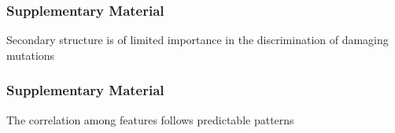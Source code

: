 \documentclass[10pt, british, luatex]{beamer}
\begin{document}
\begin{frame}
	\frametitle{Supplementary Material}
	Secondary structure is of limited importance in the discrimination of damaging mutations\\[1ex]
	{%
	\begin{center}%
		\let\bfseries\sbseries%
		
	\end{center}%
	}
\end{frame}

\begin{frame}
	\frametitle{Supplementary Material}
	The correlation among features follows predictable patterns\\[1ex]
	{%
	\centering%
	\let\bfseries\sbseries%
	
	}
\end{frame}
\end{document}
